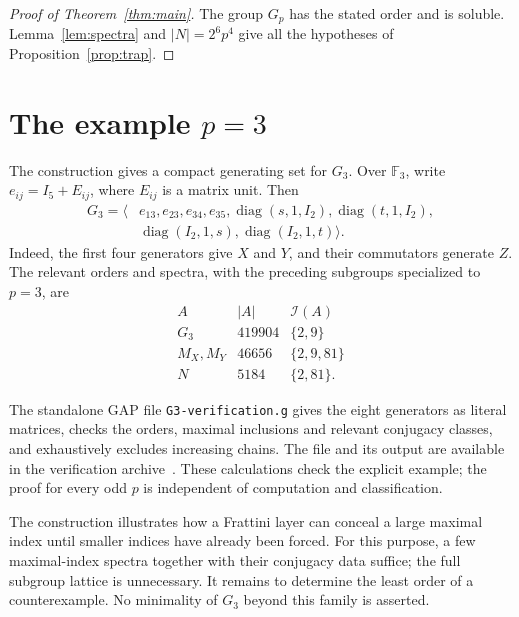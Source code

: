 \documentclass[11pt]{amsart}
\newcommand{\F}{\mathbb F}
\newcommand{\I}{\mathcal I}
\begin{document}
\begin{proof}[Proof of Theorem~\ref{thm:main}]
The group $G_p$ has the stated order and is soluble. Lemma~\ref{lem:spectra}
and $\lvert N\rvert=2^6p^4$ give all the hypotheses of
Proposition~\ref{prop:trap}.
\end{proof}

\section{The example \texorpdfstring{$p=3$}{p=3}}

The construction gives a compact generating set for $G_3$. Over $\F_3$,
write $e_{ij}=I_5+E_{ij}$, where $E_{ij}$ is a matrix unit. Then
\begin{equation}\label{eq:explicit-g3}
 \begin{split}
 G_3=\langle &e_{13},e_{23},e_{34},e_{35},
 \operatorname{diag}(s,1,I_2),\operatorname{diag}(t,1,I_2),\\
 &\operatorname{diag}(I_2,1,s),\operatorname{diag}(I_2,1,t)\rangle.
 \end{split}
\end{equation}
Indeed, the first four generators give $X$ and $Y$, and their commutators
generate $Z$. The relevant orders and spectra, with the preceding subgroups
specialized to $p=3$, are
\[
\begin{array}{c|r|c}
 A&\lvert A\rvert&\I(A)\\ \hline
 G_3&419904&\{2,9\}\\
 M_X,M_Y&46656&\{2,9,81\}\\
 N&5184&\{2,81\}.
\end{array}
\]

The standalone GAP file \texttt{G3-verification.g} gives the eight generators
as literal matrices, checks the orders, maximal inclusions and relevant
conjugacy classes, and exhaustively excludes increasing chains. The file
and its output are available in the verification archive~\cite{Repository}.
These calculations check the explicit example; the proof for every odd $p$
is independent of computation and classification.

The construction illustrates how a Frattini layer can conceal a large
maximal index until smaller indices have already been forced. For this
purpose, a few maximal-index spectra together with their conjugacy data
suffice; the full subgroup lattice is unnecessary. It remains to determine
the least order of a counterexample. No minimality of $G_3$ beyond this
family is asserted.
\end{document}
